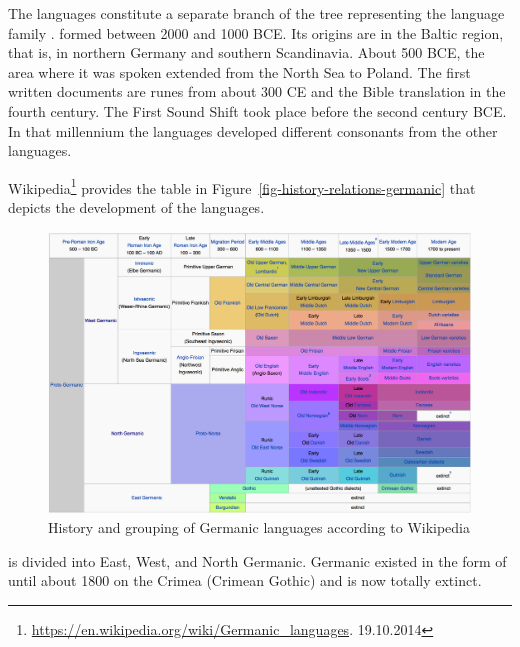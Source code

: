 The  languages constitute a separate branch of the tree representing the 
language family \citep[]{Fitch2007a-u}.
 formed between 2000 and
1000 BCE. Its origins are in the Baltic region, that is, in northern Germany and southern
Scandinavia. About 500 BCE, the area where it was spoken extended from the North Sea to Poland.
The first written documents are runes from about 300 CE and the  Bible translation in the fourth century.
The First  Sound Shift took place before the second century BCE. In that millennium the
 languages developed different consonants from the other  languages. 

Wikipedia\footnote{
\url{https://en.wikipedia.org/wiki/Germanic_languages}. 19.10.2014
} provides the table in Figure~\vref{fig-history-relations-germanic} that depicts the development of
the  languages.
\begin{figure}
\begin{sideways}
\includegraphics[width=.9\textheight]{Pictures/germanic-wikipedia}
\end{sideways}
\caption{\label{fig-history-relations-germanic}History and grouping of Germanic languages according to Wikipedia}
\end{figure}
 is divided into East, West, and North Germanic. Germanic existed in the form of 
until about 1800 on the Crimea (Crimean Gothic) and is now totally extinct. 

